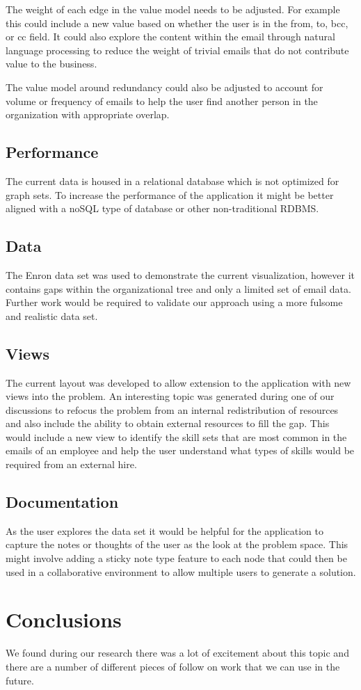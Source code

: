 \documentclass[journal]{vgtc}                %
\begin{document}
The weight of each edge in the value model needs to be adjusted.  For example this could include a new value based on whether the user is in the from, to, bcc, or cc field.  It could also explore the content within the email through natural language processing to reduce the weight of trivial emails that do not contribute value to the business.

The value model around redundancy could also be adjusted to account for volume or frequency of emails to help the user find another person in the organization with appropriate overlap.

\subsection{Performance}

The current data is housed in a relational database which is not optimized for graph sets.  To increase the performance of the application it might be better aligned with a noSQL type of database or other non-traditional RDBMS.

\subsection{Data}

The Enron data set was used to demonstrate the current visualization, however it contains gaps within the organizational tree and only a limited set of email data.  Further work would be required to validate our approach using a more fulsome and realistic data set.

\subsection{Views}

The current layout was developed to allow extension to the application with new views into the problem.  An interesting topic was generated during one of our discussions to refocus the problem from an internal redistribution of resources and also include the ability to obtain external resources to fill the gap.  This would include a new view to identify the skill sets that are most common in the emails of an employee and help the user understand what types of skills would be required from an external hire.

\subsection{Documentation}

As the user explores the data set it would be helpful for the application to capture the notes or thoughts of the user as the look at the problem space.  This might involve adding a sticky note type feature to each node that could then be used in a collaborative environment to allow multiple users to generate a solution.

\section{Conclusions}

We found during our research there was a lot of excitement about this topic and there are a number of different pieces of follow on work that we can use in the future.
\end{document}

